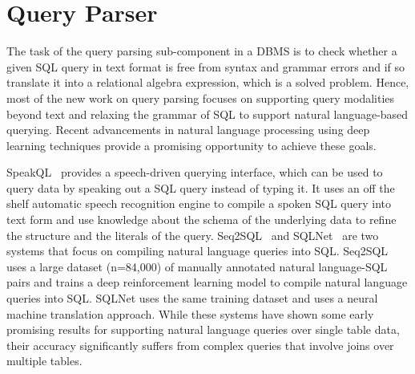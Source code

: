 \section{Query Parser}
The task of the query parsing sub-component in a DBMS is to check whether a given SQL query in text format is free from syntax and grammar errors and if so translate it into a relational algebra expression, which is a solved problem.
Hence, most of the new work on query parsing focuses on supporting query modalities beyond text and relaxing the grammar of SQL to support natural language-based querying.
Recent advancements in natural language processing using deep learning techniques provide a promising opportunity to achieve these goals.

SpeakQL~\cite{speakql} provides a speech-driven querying interface, which can be used to query data by speaking out a SQL query instead of typing it.
It uses an off the shelf automatic speech recognition engine to compile a spoken SQL query into text form and use knowledge about the schema of the underlying data to refine the structure and the literals of the query.
Seq2SQL~\cite{seq2sql} and SQLNet~\cite{sqlnet} are two systems that focus on compiling natural language queries into SQL.
Seq2SQL uses a large dataset (n=84,000) of manually annotated natural language-SQL pairs and trains a deep reinforcement learning model to compile natural language queries into SQL.
SQLNet uses the same training dataset and uses a neural machine translation approach.
While these systems have shown some early promising results for supporting natural language queries over single table data, their accuracy significantly suffers from complex queries that involve joins over multiple tables.